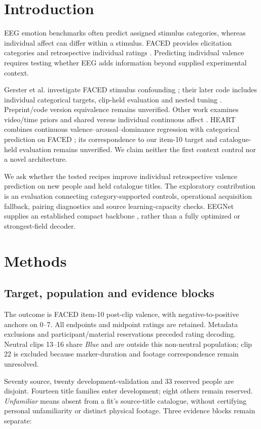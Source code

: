 \documentclass[12pt,a4paper]{article}
\begin{document}
\section{Introduction}
EEG emotion benchmarks often predict assigned stimulus categories, whereas individual affect can differ within a stimulus. FACED provides elicitation categories and retrospective individual ratings \cite{chen2023faced}. Predicting individual valence requires testing whether EEG adds information beyond supplied experimental context.

Gerster et al. investigate FACED stimulus confounding \cite{gerster2026stimulus}; their later code includes individual categorical targets, clip-held evaluation and nested tuning \cite{gerster2026code}. Preprint/code version equivalence remains unverified. Other work examines video/time priors and shared versus individual continuous affect \cite{kong2026priors,wang2026shared}. HEART combines continuous valence--arousal--dominance regression with categorical prediction on FACED \cite{fernandez2026heart}; its correspondence to our item-10 target and catalogue-held evaluation remains unverified. We claim neither the first context control nor a novel architecture.

We ask whether the tested recipes improve individual retrospective valence prediction on new people and held catalogue titles. The exploratory contribution is an evaluation connecting category-supported controls, operational acquisition fallback, pairing diagnostics and source learning-capacity checks. EEGNet supplies an established compact backbone \cite{lawhern2018eegnet}, rather than a fully optimized or strongest-field decoder.

\section{Methods}
\subsection{Target, population and evidence blocks}
The outcome is FACED item-10 post-clip valence, with negative-to-positive anchors on 0--7. All endpoints and midpoint ratings are retained. Metadata exclusions and participant/material reservations preceded rating decoding. Neutral clips 13--16 share \emph{Blue} and are outside this non-neutral population; clip 22 is excluded because marker-duration and footage correspondence remain unresolved.

Seventy source, twenty development-validation and 33 reserved people are disjoint. Fourteen title families enter development; eight others remain reserved. \emph{Unfamiliar} means absent from a fit's source-title catalogue, without certifying personal unfamiliarity or distinct physical footage. Three evidence blocks remain separate:
\end{document}
